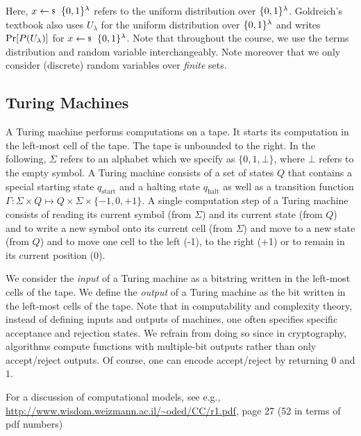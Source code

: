 \documentclass[a4paper,table,dvipsnames]{article}
\theoremstyle{definition}
\begin{document}
Here, $x\sample\bin^\lambda$ refers to the uniform distribution over $\{0,1\}^\lambda$. Goldreich's textbook also uses $U_\lambda$ for the uniform distribution over $\{0,1\}^\lambda$ and writes $\prob{P(U_\lambda)}$ for $x\sample\bin^\lambda$. Note that throughout the course, we use the terms distribution and random variable interchangeably. Note moreover that we only consider (discrete) random variables over \emph{finite} sets.

\subsection{Turing Machines}\label{subsec:Turing}
A Turing machine performs computations on a tape. It starts its computation in the left-most cell of the tape. The tape is unbounded to the right. In the following, $\Sigma$ refers to an alphabet which we specify as $\{0,1,\bot\}$, where $\bot$ refers to the empty symbol. A Turing machine consists of a set of states $Q$ that contains a special starting state $q_\text{start}$ and a halting state $q_\text{halt}$ as well as a transition function $\Gamma:\Sigma\times Q\mapsto Q\times\Sigma\times\{-1,0,+1\}$. A single computation step of a Turing machine consists of reading its current symbol (from $\Sigma$) and its current state (from $Q$) and to write a new symbol onto its current cell (from $\Sigma$) and move to a new state (from $Q$) and to move one cell to the left (-1), to the right (+1) or to remain in its current position (0).

We consider the \emph{input} of a Turing machine as a bitstring written in the left-most cells of the tape. We define the \emph{output} of a Turing machine as the bit written in the left-most cells of the tape. Note that in computability and complexity theory, instead of defining inputs and outputs of machines, one often specifies specific acceptance and rejection states. We refrain from doing so since in cryptography, algorithms compute functions with multiple-bit outputs rather than only accept/reject outputs. Of course, one can encode accept/reject by returning $0$ and $1$.

For a discussion of computational models, see e.g., \url{http://www.wisdom.weizmann.ac.il/~oded/CC/r1.pdf}, page 27 (52 in terms of pdf numbers)
\end{document}
